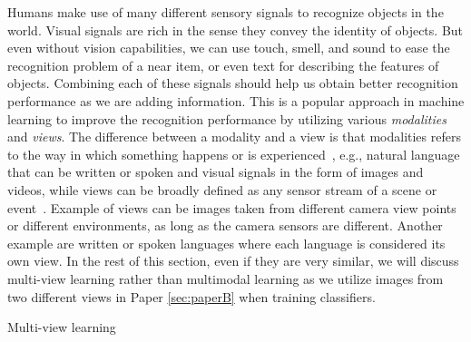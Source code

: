Humans make use of many different sensory signals to recognize objects in the world. Visual signals are rich in the sense they convey the identity of objects. But even without vision capabilities, we can use touch, smell, and sound to ease the recognition problem of a near item, or even text for describing the features of objects. Combining each of these signals should help us obtain better recognition performance as we are adding information. This is a popular approach in machine learning to improve the recognition performance by utilizing various \textit{modalities} and \textit{views}. The difference between a modality and a view is that modalities refers to the way in which something happens or is experienced~\cite{baltruvsaitis2018multimodal}, e.g., natural language that can be written or spoken and visual signals in the form of images and videos, while views can be broadly defined as any sensor stream of a scene or event~\cite{salzmann2010factorized}. Example of views can be images taken from different camera view points or different environments, as long as the camera sensors are different. Another example are written or spoken languages where each language is considered its own view. In the rest of this section, even if they are very similar, we will discuss multi-view learning rather than multimodal learning as we utilize images from two different views in Paper \ref{sec:paperB} when training classifiers. 

Multi-view learning 





